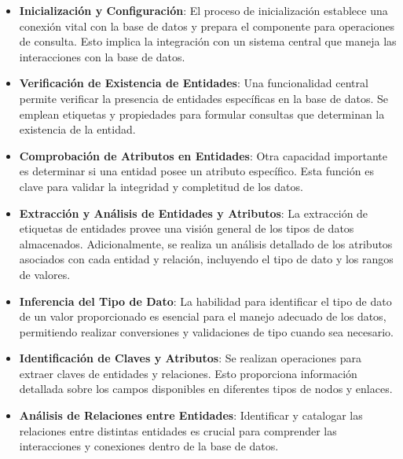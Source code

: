 \begin{itemize}
\item \textbf{Inicialización y Configuración}: El proceso de inicialización establece una conexión vital con la base de datos y prepara el componente para operaciones de consulta. Esto implica la integración con un sistema central que maneja las interacciones con la base de datos.

\item \textbf{Verificación de Existencia de Entidades}: Una funcionalidad central permite verificar la presencia de entidades específicas en la base de datos. Se emplean etiquetas y propiedades para formular consultas que determinan la existencia de la entidad.

\item \textbf{Comprobación de Atributos en Entidades}: Otra capacidad importante es determinar si una entidad posee un atributo específico. Esta función es clave para validar la integridad y completitud de los datos.

\item \textbf{Extracción y Análisis de Entidades y Atributos}: La extracción de etiquetas de entidades provee una visión general de los tipos de datos almacenados. Adicionalmente, se realiza un análisis detallado de los atributos asociados con cada entidad y relación, incluyendo el tipo de dato y los rangos de valores.

\item \textbf{Inferencia del Tipo de Dato}: La habilidad para identificar el tipo de dato de un valor proporcionado es esencial para el manejo adecuado de los datos, permitiendo realizar conversiones y validaciones de tipo cuando sea necesario.

\item \textbf{Identificación de Claves y Atributos}: Se realizan operaciones para extraer claves de entidades y relaciones. Esto proporciona información detallada sobre los campos disponibles en diferentes tipos de nodos y enlaces.

\item \textbf{Análisis de Relaciones entre Entidades}: Identificar y catalogar las relaciones entre distintas entidades es crucial para comprender las interacciones y conexiones dentro de la base de datos.
\end{itemize}

